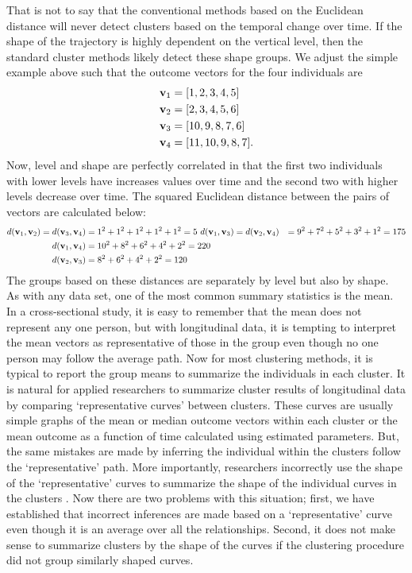 That is not to say that the conventional methods based on the Euclidean distance will never detect clusters based on the temporal change over time. If the shape of the trajectory is highly dependent on the vertical level, then the standard cluster methods likely detect these shape groups. We adjust the simple example above such that the outcome vectors for the four individuals are
\begin{align*}
\mathbf v_{1}&=[1,2,3,4,5]\\
\mathbf v_{2}&=[2,3,4,5,6]\\
\mathbf v_{3}&=[10,9,8,7,6]\\
\mathbf v_{4}&=[11,10,9,8,7].
\end{align*}
Now, level and shape are perfectly correlated in that the first two individuals with lower levels have increases values over time and the second two with higher levels decrease over time. The squared Euclidean distance between the pairs of vectors are calculated below:
\begin{align*}
d(\mathbf v_{1},\mathbf v_{2}) = d(\mathbf v_{3},\mathbf v_{4}) &= 1^{2}+1^{2}+1^{2}+1^{2} + 1^{2} = 5\
d(\mathbf v_{1},\mathbf v_{3}) = d(\mathbf v_{2},\mathbf v_{4}) &= 9^{2}+7^{2}+5^{2}+3^{2}+1^{2}=175\\
d(\mathbf v_{1},\mathbf v_{4}) &= 10^{2}+8^{2}+6^{2}+4^{2}+2^{2}=220\\
d(\mathbf v_{2},\mathbf v_{3}) &= 8^{2}+6^{2}+4^{2}+2^{2}=120
\end{align*}
The groups based on these distances are separately by level but also by shape. \\

As with any data set, one of the most common summary statistics is the mean. In a cross-sectional study, it is easy to remember that the mean does not represent any one person, but with longitudinal data, it is tempting to interpret the mean vectors as representative of those in the group even though no one person may follow the average path. Now for most clustering methods, it is typical to report the group means to summarize the individuals in each cluster. It is natural for applied researchers to summarize cluster results of longitudinal data by comparing `representative curves' between clusters. These curves are usually simple graphs of the mean or median outcome vectors within each cluster or the mean outcome as a function of time calculated using estimated parameters. But, the same mistakes are made by inferring the individual within the clusters follow the `representative' path. More importantly, researchers incorrectly use the shape of the `representative' curves to summarize the shape of the individual curves in the clusters \cite{windle2004,mulvaney2006,broadbent2008,pryor2011,mccoy2010}. Now there are two problems with this situation; first, we have established that incorrect inferences are made based on a `representative' curve  even though it is an average over all the relationships. Second, it does not make sense to summarize clusters by the shape of the curves if the clustering procedure did not group similarly shaped curves. \\

